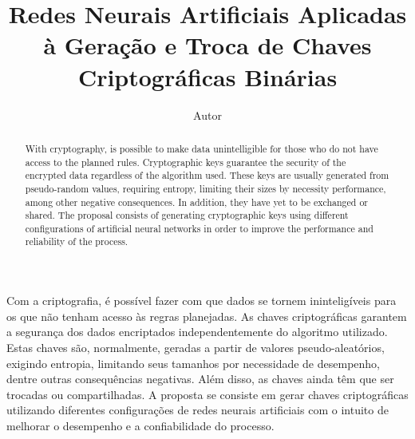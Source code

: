 \documentclass[12pt]{article}
\begin{document}

    \title{
        Redes Neurais Artificiais Aplicadas à Geração e Troca de Chaves Criptográficas Binárias
    }
    
    \author{Autor}

    
    
    \address{
        Instituição\\Endereço
    }

    \maketitle

    \begin{abstract}
        With cryptography, is possible to make data unintelligible for those who do not have access to the planned rules. Cryptographic keys guarantee the security of the encrypted data regardless of the algorithm used. These keys are usually generated from pseudo-random values, requiring entropy, limiting their sizes by necessity performance, among other negative consequences. In addition, they have yet to be exchanged or shared. The proposal consists of generating cryptographic keys using different configurations of artificial neural networks in order to improve the performance and reliability of the process.
    \end{abstract}


    \begin{resumo}
        Com a criptografia, é possível fazer com que dados se tornem ininteligíveis para os que não tenham acesso às regras planejadas. As chaves criptográficas garantem a segurança dos dados encriptados independentemente do algoritmo utilizado. Estas chaves são, normalmente, geradas a partir de valores pseudo-aleatórios, exigindo entropia, limitando seus tamanhos por necessidade de desempenho, dentre outras consequências negativas. Além disso, as chaves ainda têm que ser trocadas ou compartilhadas. A proposta se consiste em gerar chaves criptográficas utilizando diferentes configurações de redes neurais artificiais com o intuito de melhorar o desempenho e a confiabilidade do processo.
        
    \end{resumo}
  
\end{document}
